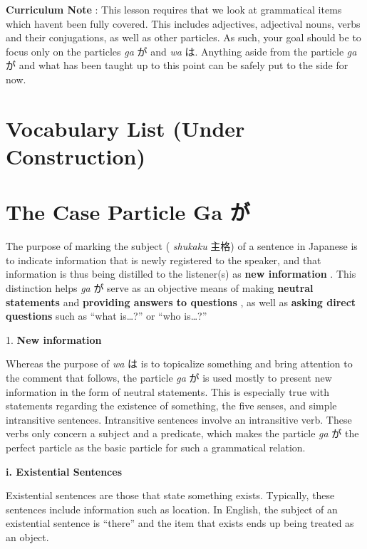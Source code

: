 \par{\textbf{Curriculum Note }: This lesson requires that we look at grammatical items which haven\textquotesingle t been fully covered. This includes adjectives, adjectival nouns, verbs and their conjugations, as well as other particles. As such, your goal should be to focus only on the particles \emph{ga }が and \emph{wa }は. Anything aside from the particle \emph{ga }が and what has been taught up to this point can be safely put to the side for now. }
      
\section{Vocabulary List (Under Construction)}
       
\section{The Case Particle Ga が}
 
\par{ The purpose of marking the subject ( \emph{shukaku }主格) of a sentence in Japanese is to indicate information that is newly registered to the speaker, and that information is thus being distilled to the listener(s) as \textbf{new information }. This distinction helps \emph{ga }が serve as an objective means of making \textbf{neutral statements }and \textbf{providing answers to questions }, as well as \textbf{asking direct questions }such as “what is…?” or “who is…?” }

\par{1. \textbf{New information }}

\par{ Whereas the purpose of \emph{wa }は is to topicalize something and bring attention to the comment that follows, the particle \emph{ga }が is used mostly to present new information in the form of neutral statements. This is especially true with statements regarding the existence of something, the five senses, and simple intransitive sentences. Intransitive sentences involve an intransitive verb. These verbs only concern a subject and a predicate, which makes the particle \emph{ga }が the perfect particle as the basic particle for such a grammatical relation. }

\begin{center}
\textbf{i. Existential Sentences }
\end{center}

\par{ Existential sentences are those that state something exists. Typically, these sentences include information such as location. In English, the subject of an existential sentence is “there” and the item that exists ends up being treated as an object. }

